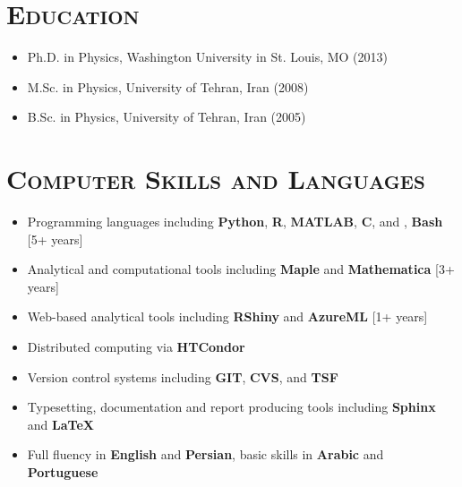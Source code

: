 \documentclass[10pt,a4paper]{moderncv}
\begin{document}
\vspace{.2cm}
\section{\textsc{Education}}
\begin{itemize}
\item Ph.D. in Physics, Washington University in St. Louis, MO (2013)
\item M.Sc. in Physics, University of Tehran, Iran (2008)
\item B.Sc. in Physics, University of Tehran, Iran (2005)
\end{itemize}


\vspace{.2cm}
\section{\textsc{Computer Skills and Languages}}
\begin{itemize}
\item Programming languages including \textbf{Python}, \textbf{R}, \textbf{MATLAB}, \textbf{C}, and , \textbf{Bash} [5+ years]
\item Analytical and computational tools including \textbf{Maple} and \textbf{Mathematica} [3+ years]
\item Web-based analytical tools including \textbf{RShiny} and \textbf{AzureML} [1+ years]
\item Distributed computing via \textbf{HTCondor}
\item Version control systems including \textbf{GIT}, \textbf{CVS}, and \textbf{TSF}
\item Typesetting, documentation and report producing tools including \textbf{Sphinx} and \textbf{\LaTeX}\\
\item Full fluency in \textbf{English} and \textbf{Persian}, basic skills in \textbf{Arabic} and \textbf{Portuguese}
\end{itemize}
\end{document}
